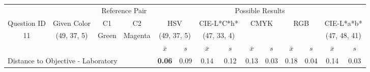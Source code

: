 \begin{table}[H]
  \resizebox{\textwidth}{!} {
  \begin{tabular}{lccccccccccccc}
    \hline
    \multicolumn{1}{c}{}                              &                                      & \multicolumn{2}{c}{Reference Pair}                   & \multicolumn{10}{c}{Possible Results}                                                                                                                                                                                                                                                                                        \\ \cline{3-14}
    \multicolumn{1}{c}{\multirow{-2}{*}{Question ID}} & \multirow{-2}{*}{Given Color}        & C1                       & C2                         & \multicolumn{2}{c}{HSV}                                        & \multicolumn{2}{c}{CIE-L*C*h*}                                 & \multicolumn{2}{c}{CMYK}                                       & \multicolumn{2}{c}{RGB}                                        & \multicolumn{2}{c}{CIE-L*a*b*}                                 \\ \hline
    \multicolumn{1}{c}{11}                             & \cellcolor[HTML]{FF8000}(49, 37, 5) & \multicolumn{1}{c|}{Green} & \multicolumn{1}{c|}{Magenta}  & \multicolumn{2}{c|}{\cellcolor[HTML]{FF8000}(49, 37, 5)}      & \multicolumn{2}{c|}{\cellcolor[HTML]{FF6F00}(47, 33, 4)}       & \multicolumn{2}{c|}{\cellcolor[HTML]{808080}{\color[HTML]{FFFFFF}(21, 22, 24)}}       & \multicolumn{2}{c|}{\cellcolor[HTML]{808080}{\color[HTML]{FFFFFF}(21, 22, 24)}}       & \multicolumn{2}{c|}{\cellcolor[HTML]{C9B2A2}(47, 48, 41)}       \\ \hline
                                                      & \multicolumn{1}{l}{}                 & \multicolumn{1}{l}{}     & \multicolumn{1}{l}{}       & \multicolumn{1}{c}{$\overline{x}$} & \multicolumn{1}{c}{$s$} & \multicolumn{1}{c}{$\overline{x}$} & \multicolumn{1}{c}{$s$} & \multicolumn{1}{c}{$\overline{x}$} & \multicolumn{1}{c}{$s$} & \multicolumn{1}{c}{$\overline{x}$} & \multicolumn{1}{c}{$s$} & \multicolumn{1}{c}{$\overline{x}$} & \multicolumn{1}{c}{$s$} \\ \hline
    \multicolumn{4}{l}{Distance to Objective - Laboratory}                                                                                           & \multicolumn{1}{|c}{\textbf{0.06}}       & \multicolumn{1}{c|}{0.09}    & \multicolumn{1}{|c}{0.14}       & \multicolumn{1}{c|}{0.12}    & \multicolumn{1}{|c}{0.13}       & \multicolumn{1}{c|}{0.03}    & \multicolumn{1}{|c}{0.18}       & \multicolumn{1}{c|}{0.04}    & \multicolumn{1}{|c}{0.14}       & \multicolumn{1}{c|}{0.03}    \\

\end{tabular}}
\end{table}
